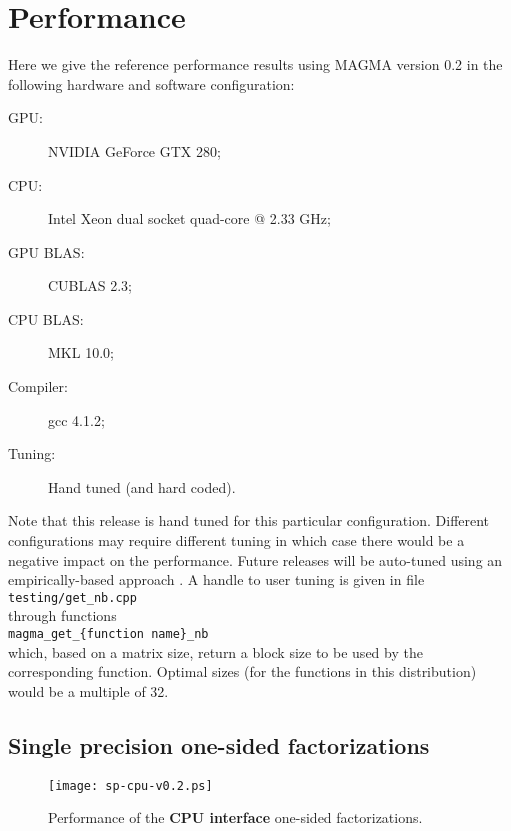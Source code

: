 \documentclass[10pt]{book}
\begin{document}
\chapter{Performance}\label{ch:performance}

Here we give the reference performance results using MAGMA version 0.2 
in the following hardware and software configuration:

\vspace{0.2in}
\begin{description}
\item[GPU:]  NVIDIA GeForce GTX 280;
\item[CPU:] Intel Xeon dual socket quad-core @ 2.33 GHz;
\item[GPU BLAS:] CUBLAS 2.3;
\item[CPU BLAS:] MKL 10.0;
\item[Compiler:] gcc 4.1.2;
\item[Tuning:] Hand tuned (and hard coded).
\end{description}

\vspace{0.2in}
Note that this release is hand tuned for this particular configuration.
Different configurations may require different tuning in which case
there would be a negative impact on the performance.
Future releases will be auto-tuned using an empirically-based 
approach \cite{lawn212}. A handle to user tuning is given in file \\
{\tt testing/get\_nb.cpp} \\
through functions \\
{\tt magma\_get\_\{function name\}\_nb}\\
which, based on a matrix
size, return a block size to be used by the corresponding function.
Optimal sizes (for the functions in this distribution) 
would be a multiple of 32.

\newpage
\section{Single precision one-sided factorizations}
       \begin{figure}[!ht]
          \centering
          \hspace{-5mm}
          \texttt{[image: sp-cpu-v0.2.ps]}
          \caption{Performance of the {\bf CPU interface} 
                   one-sided factorizations.}
       \label{sp-cpu-performance}
       \end{figure}
\end{document}
